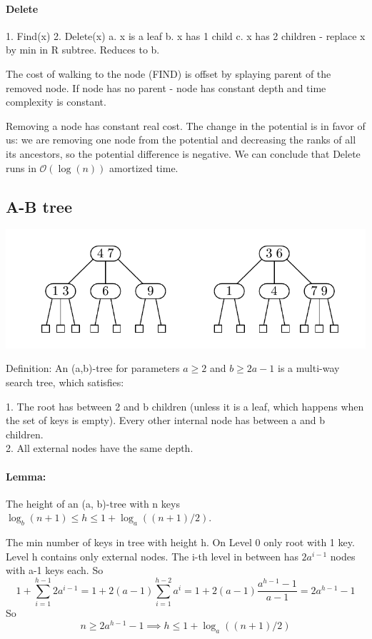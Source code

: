 \documentclass[12pt]{article}
\newcommand{\bigO}{\mathcal{O}}
\newcommand{\bigOlog}{\bigO(\log(n))}
\begin{document}
\paragraph{Delete}

1. Find(x)
2. Delete(x)
	a. x is a leaf
	b. x has 1 child
	c. x has 2 children - replace x by min in R subtree. Reduces to b.

The cost of walking to the node (FIND) is offset by splaying parent of the removed node. If node has no parent - node has constant depth and time complexity is constant.

Removing a node has constant real cost. The change in the potential is in favor of us: we are removing one node from the potential and decreasing the ranks of all its ancestors, so the potential difference is negative.
We can conclude that Delete runs in $\bigOlog$ amortized time.

\subsection{A-B tree}
\includegraphics[scale=0.5]{a_b_tree}

Definition: An (a,b)-tree for parameters $a \geq 2$ and $b \geq 2a - 1$ is a multi-way search tree, which satisfies:

1. The root has between 2 and b children (unless it is a leaf, which happens when the set of keys is empty). Every other internal node has between a and b children. \\
2. All external nodes have the same depth.

\paragraph{Lemma:} The height of an (a, b)-tree with n keys $  \log_b(n + 1) \leq h \leq 1 + \log_a ((n + 1)/2)$.

The min number of keys in tree with height h. On Level 0 only root with 1 key. Level h contains only external nodes. The i-th level in between has $2a^{i-1}$ nodes with a-1 keys each. So
\[ 1 + \sum_{i=1}^{h-1} 2a^{i-1} = 1 + 2(a-1) \sum_{i=1}^{h-2} a^i = 1 + 2(a-1) \frac{a^{h-1} - 1}{a-1} = 2a^{h-1} - 1 \]
So
\[ n \geq 2a^{h-1} - 1 \implies h \leq 1 + \log_a ((n + 1)/2) \]
\end{document}
